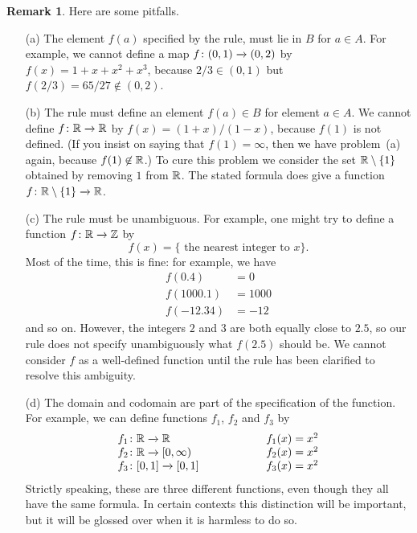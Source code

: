 \documentclass[a4paper]{book}
\theoremstyle{definition}
\newtheorem{remark}[theorem]{Remark}
\begin{document}
\begin{remark}
 Here are some pitfalls.
 \begin{itemize}
  \item[(a)] The element $f(a)$ specified by the rule, must
    lie in $B$ for  $a\in A$.  For example, we
   cannot define a map $f\colon(0,1)\xrightarrow{}(0,2)$ by $f(x)=1+x+x^2+x^3$,
   because $2/3\in(0,1)$ but $f(2/3)=65/27\not\in(0,2)$.
  \item[(b)] The rule must define an element $f(a)\in B$ for
    element $a\in A$.  We cannot define $f\colon{\mathbb{R}}\xrightarrow{}{\mathbb{R}}$ by
   $f(x)=(1+x)/(1-x)$, because $f(1)$ is not defined.  (If you insist
   on saying that $f(1)=\infty$, then we have problem~(a) again,
   because $f(1)\not\in{\mathbb{R}}$.)  To cure this problem we consider the set
   ${\mathbb{R}}\setminus\{1\}$ obtained by removing $1$ from ${\mathbb{R}}$.  The stated
   formula does give a function $f\colon{\mathbb{R}}\setminus\{1\}\xrightarrow{}{\mathbb{R}}$.
  \item[(c)] The rule must be unambiguous.  For example, one might try
   to define a function $f\colon{\mathbb{R}}\xrightarrow{}{\mathbb{Z}}$ by
   \[ f(x) = \{ \text{ the nearest integer to } x \}. \]
   Most of the time, this is fine: for example, we have
   \begin{align*}
    f(0.4)    &= 0 \\
    f(1000.1) &= 1000 \\
    f(-12.34) &= -12
   \end{align*}
   and so on.  However, the integers $2$ and $3$ are both equally close
   to $2.5$, so our rule does not specify unambiguously what $f(2.5)$
   should be.  We cannot consider $f$ as a well-defined function until
   the rule has been clarified to resolve this ambiguity.
  \item[(d)] The domain and codomain are part of the specification of
   the function.  For example, we can define functions $f_1$, $f_2$ and
   $f_3$ by
   \[ \begin{array}{lll}
    f_1\colon{\mathbb{R}}\xrightarrow{}{\mathbb{R}}         &\hspace{4em}& f_1(x) = x^2 \\
    f_2\colon{\mathbb{R}}\xrightarrow{}[0,\infty) &\hspace{4em}& f_2(x) = x^2 \\
    f_3\colon[0,1]\xrightarrow{}[0,1]   &\hspace{4em}& f_3(x) = x^2
   \end{array} \]
   Strictly speaking, these are three different functions, even though
   they all have the same formula.  In certain contexts this
   distinction will be important, but it will be glossed over when it
   is harmless to do so.
 \end{itemize}
\end{remark}
\end{document}
